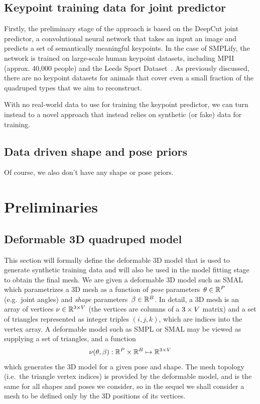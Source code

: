 \subsection{Keypoint training data for joint predictor}

Firstly, the preliminary stage of the approach is based on the DeepCut joint predictor, a convolutional neural network that takes an input an image and predicts a set of semantically meaningful keypoints. In the case of SMPLify, the network is trained on large-scale human keypoint datasets, including MPII~\cite{andriluka14cvpr} (approx. 40,000 people) and the Leeds Sport Dataset~\cite{johnson2010clustered}. As previously discussed, there are no keypoint datasets for animals that cover even a small fraction of the quadruped types that we aim to reconstruct. 

With no real-world data to use for training the keypoint predictor, we can turn instead to a novel approach that instead relies on synthetic (or fake) data for training. 


\subsection{Data driven shape and pose priors}

Of course, we also don't have any shape or pose priors.


\section{Preliminaries}

\subsection{Deformable 3D quadruped model}

This section will formally define the deformable 3D model that is used to generate synthetic training data and will also be used in the model fitting stage to obtain the final mesh. We are given a deformable 3D model such as SMAL~\cite{zuffi2017menagerie} which parametrizes a 3D mesh as a function of {\em pose} parameters~$\theta \in {\mathbb{R}^{P}}$ (e.g.\ joint angles) and {\em shape} parameters~$\beta \in {\mathbb{R}^{B}}$. 
In detail, a 3D mesh is an array of vertices $\nu \in {\mathbb{R}^{3 \times V}}$ (the vertices are columns of a $3 \times V$ matrix) and a set of triangles represented as integer triples $(i,j,k)$, which are indices into the vertex array.
A deformable model such as SMPL or SMAL may be viewed as supplying a set of triangles, and a function
\begin{equation}
\nu(\theta, \beta) : {\mathbb{R}^{P}} \times {\mathbb{R}^{B}} \mapsto {\mathbb{R}^{3 \times V}}
\end{equation}
which generates the 3D model for a given pose and shape.
The mesh topology (i.e.~the triangle vertex indices) is provided by the deformable model, and is the same for all shapes and poses we consider, so in the sequel we shall consider a mesh to be defined only by the 3D positions of its vertices.

